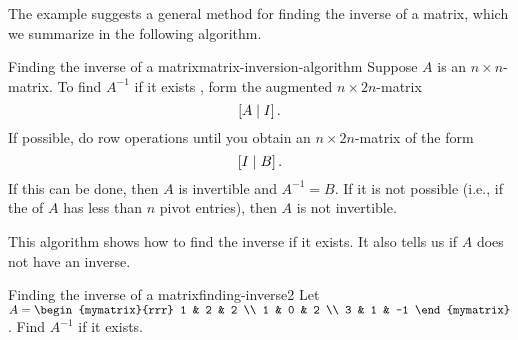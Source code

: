 The example suggests a general method for finding the inverse of a
matrix, which we summarize in the following algorithm.

\begin{algorithm}{Finding the inverse of a matrix}{matrix-inversion-algorithm}
  Suppose $A$ is an $n\times n$-matrix. To find $A^{-1}$ if it exists%
  , form the augmented
  $n\times 2n$-matrix
  \begin{equation*}
    \left[A\mid I\right].
  \end{equation*}
  If possible, do row operations until you obtain an
  $n\times 2n$-matrix of the form
  \begin{equation*}
    \left[I\mid B\right].
  \end{equation*}
  If this can be done, then $A$ is invertible and $A^{-1}=B$. If it is
  not possible (i.e., if the {\rref} of $A$ has less than
  $n$ pivot entries), then $A$ is not invertible.
\end{algorithm}

This algorithm shows how to find the inverse if it exists. It also
tells us if $A$ does not have an inverse.

\begin{example}{Finding the inverse of a matrix}{finding-inverse2}
  Let $A=\begin{mymatrix}{rrr}
    1 & 2 & 2 \\
    1 & 0 & 2 \\
    3 & 1 & -1
  \end{mymatrix}$. Find $A^{-1}$ if it exists.
\end{example}

